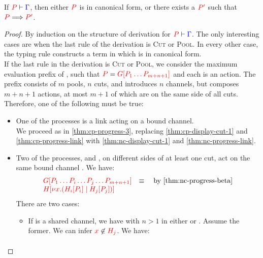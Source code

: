 \begin{theorem}[Progress]\label{thm:nc-progress}
  If $\seq[{ P }]{ \Gamma }$, then either $\tm{P}$ is in canonical form, or
  there exists a $\tm{P'}$ such that $\reducesto{P}{P'}$. 
\end{theorem}
\begin{proof}
  By induction on the structure of derivation for $\seq[{ P }]{ \Gamma }$.
  The only interesting cases are when the last rule of the derivation is
  \textsc{Cut} or \textsc{Pool}. In every other case, the typing rule constructs
  a term in which is in canonical form. 
  \\
  If the last rule in the derivation is \textsc{Cut} or \textsc{Pool}, we
  consider the maximum evaluation prefix  of , such that $\tm{P} =
  \tm{\cpPlug{G}{P_1 \dots P_{m+n+1}}}$ and each  is an action.
  The prefix  consists of $m$ pools, $n$ cuts, and introduces $n$
  channels, but composes $m+n+1$ actions, at most $m+1$ of which are on the same
  side of all cuts.
  Therefore, one of the following must be true:
  \begin{itemize}
  \item
    One of the processes is a link  acting on a bound channel.
    \\
    We proceed as in \cref{thm:cp-progress-3},
    replacing \cref{thm:cp-display-cut-1} and \cref{thm:cp-progress-link}
    with \cref{thm:nc-display-cut-1} and \cref{thm:nc-progress-link}.
  \item
    Two of the processes,  and , on different sides of at least
    one cut, act on the same bound channel . We have:
    \begin{gather*}
      \begin{array}{ll}
        \tm{\cpPlug{G}{P_1 \dots P_i \dots P_j \dots P_{m+n+1}}}
        & \equiv \quad \text{by \cref{thm:nc-progress-beta}} \\
        \tm{\cpPlug{H}{\cpCut{x}{\cpPlug{H_i}{P_i}}{\cpPlug{H_j}{P_j}}}}
      \end{array}
    \end{gather*}
    There are two cases:
    \begin{itemize}
    \item
      If  is a shared channel, we have  with $n > 1$ 
      in either  or .
      Assume the former. 
      We can infer $\notFreeIn{x}{H_j}$.
      We have:
      \begin{gather*}

\end{gather*}
\end{itemize}
\end{itemize}
\end{proof}
